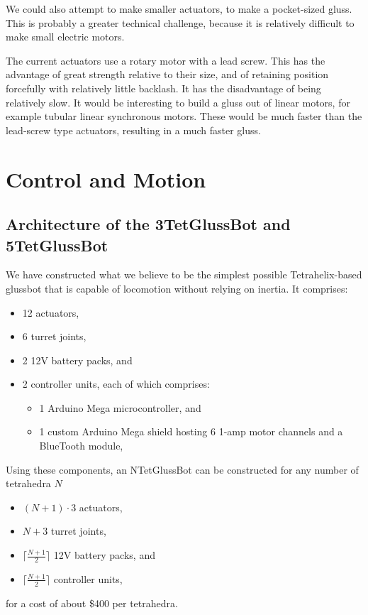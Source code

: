 \documentclass[11pt]{article}
\begin{document}
We could also attempt to make smaller actuators, to make a pocket-sized gluss. This is probably
a greater technical challenge, because it is relatively difficult to make small electric motors.

The current actuators use a rotary motor with a lead screw. This has the advantage of great
strength relative to their size, and of retaining position forcefully with relatively little backlash. It has the disadvantage
of being relatively slow. It would be interesting to build a gluss out of linear motors, for
example tubular linear synchronous motors. These would be much faster than the lead-screw type
actuators, resulting in a much faster gluss. 

\section{Control and Motion}
\subsection{Architecture of the 3TetGlussBot and 5TetGlussBot}

We have constructed what we believe to be the simplest possible Tetrahelix-based glussbot that is capable of locomotion
without relying on inertia.
It comprises:
\begin{itemize}  
\item 12 actuators,
\item 6 turret joints,
\item 2 12V battery packs, and
\item 2 controller units, each of which comprises:
\begin{itemize}  
\item 1 Arduino Mega microcontroller, and
\item 1 custom Arduino Mega shield hosting 6 1-amp motor channels and a BlueTooth module,
\end{itemize}  
\end{itemize}

Using these components, an NTetGlussBot can be constructed for any number of tetrahedra $N$

\begin{itemize}  
\item $(N + 1)\cdot 3$  actuators,
\item $N+3$ turret joints,
\item $\lceil \frac{N + 1}{2} \rceil$ 12V battery packs, and
\item $\lceil \frac{N + 1}{2} \rceil$ controller units,
\end{itemize}
for a cost of about \$400 per tetrahedra.
\end{document}
